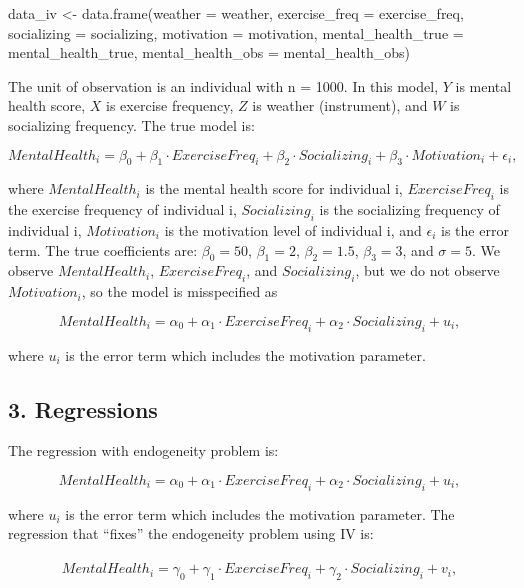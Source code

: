 \documentclass[
  letterpaper,
  DIV=11,
  numbers=noendperiod]{scrartcl}
\newenvironment{Shaded}{\begin{snugshade}}{\end{snugshade}}
\newcommand{\AttributeTok}[1]{\textcolor[rgb]{0.40,0.45,0.13}{#1}}
\newcommand{\FunctionTok}[1]{\textcolor[rgb]{0.28,0.35,0.67}{#1}}
\newcommand{\NormalTok}[1]{\textcolor[rgb]{0.00,0.23,0.31}{#1}}
\newcommand{\OtherTok}[1]{\textcolor[rgb]{0.00,0.23,0.31}{#1}}
\begin{document}
\begin{Shaded}
\begin{Highlighting}[]
\NormalTok{data\_iv }\OtherTok{\textless{}{-}} \FunctionTok{data.frame}\NormalTok{(}\AttributeTok{weather =}\NormalTok{ weather,}
  \AttributeTok{exercise\_freq =}\NormalTok{ exercise\_freq,}
  \AttributeTok{socializing =}\NormalTok{ socializing,}
  \AttributeTok{motivation =}\NormalTok{ motivation,}
  \AttributeTok{mental\_health\_true =}\NormalTok{ mental\_health\_true,}
  \AttributeTok{mental\_health\_obs =}\NormalTok{ mental\_health\_obs)}
\end{Highlighting}
\end{Shaded}

The unit of observation is an individual with n = 1000. In this model,
\(Y\) is mental health score, \(X\) is exercise frequency, \(Z\) is
weather (instrument), and \(W\) is socializing frequency. The true model
is:

\[MentalHealth_i = \beta_0 + \beta_1\cdot ExerciseFreq_i + \beta_2\cdot Socializing_i + \beta_3\cdot Motivation_i + \epsilon_i,\]

where \(MentalHealth_i\) is the mental health score for individual i,
\(ExerciseFreq_i\) is the exercise frequency of individual i,
\(Socializing_i\) is the socializing frequency of individual i,
\(Motivation_i\) is the motivation level of individual i, and
\(\epsilon_i\) is the error term. The true coefficients are:
\(\beta_0 = 50\), \(\beta_1 = 2\), \(\beta_2 = 1.5\), \(\beta_3 = 3\),
and \(\sigma = 5\). We observe \(MentalHealth_i\), \(ExerciseFreq_i\),
and \(Socializing_i\), but we do not observe \(Motivation_i\), so the
model is misspecified as

\[MentalHealth_i = \alpha_0 + \alpha_1\cdot ExerciseFreq_i + \alpha_2\cdot Socializing_i + u_i,\]

where \(u_i\) is the error term which includes the motivation parameter.

\subsection{3. Regressions}\label{regressions-1}

The regression with endogeneity problem is:

\[MentalHealth_i = \alpha_0 + \alpha_1\cdot ExerciseFreq_i + \alpha_2\cdot Socializing_i + u_i,\]

where \(u_i\) is the error term which includes the motivation parameter.
The regression that ``fixes'' the endogeneity problem using IV is:

\[MentalHealth_i = \gamma_0 + \gamma_1\cdot \hat{ExerciseFreq}_i + \gamma_2\cdot Socializing_i + v_i,\]
\end{document}
